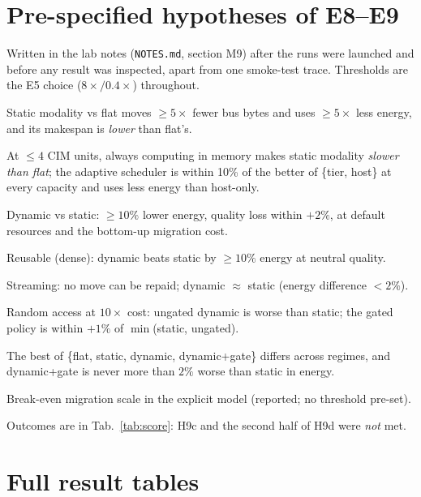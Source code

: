 \documentclass[10pt,a4paper]{article}
\begin{document}
\section{Pre-specified hypotheses of E8--E9}
Written in the lab notes (\texttt{NOTES.md}, section M9) after the runs were launched and before any result was inspected, apart from one smoke-test trace. Thresholds are the E5 choice ($8\times/0.4\times$) throughout.
\begin{description}[leftmargin=1.1cm,labelwidth=0.9cm,itemsep=1pt]
\item[H8a] Static modality vs flat moves $\ge5\times$ fewer bus bytes and uses $\ge5\times$ less energy, and its makespan is \emph{lower} than flat's.
\item[H8b] At $\le4$ CIM units, always computing in memory makes static modality \emph{slower than flat}; the adaptive scheduler is within 10\% of the better of \{tier, host\} at every capacity and uses less energy than host-only.
\item[H8c] Dynamic vs static: $\ge10\%$ lower energy, quality loss within $+2\%$, at default resources and the bottom-up migration cost.
\item[H9a] Reusable (dense): dynamic beats static by $\ge10\%$ energy at neutral quality.
\item[H9b] Streaming: no move can be repaid; dynamic $\approx$ static (energy difference $<2\%$).
\item[H9c] Random access at $10\times$ cost: ungated dynamic is worse than static; the gated policy is within $+1\%$ of $\min$(static, ungated).
\item[H9d] The best of \{flat, static, dynamic, dynamic+gate\} differs across regimes, and dynamic+gate is never more than $2\%$ worse than static in energy.
\item[H9e] Break-even migration scale in the explicit model (reported; no threshold pre-set).
\end{description}
Outcomes are in Tab.~\ref{tab:score}: H9c and the second half of H9d were \emph{not} met.

\section{Full result tables}


\end{document}
